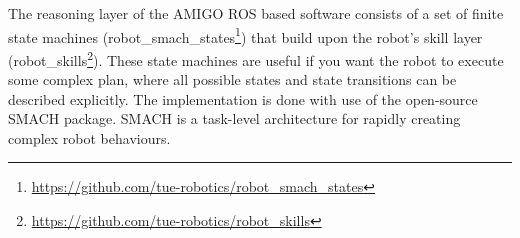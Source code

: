 The reasoning layer of the AMIGO ROS based software consists of a set of finite state machines (robot\_smach\_states\footnote{\url{https://github.com/tue-robotics/robot_smach_states}}) that build upon the robot’s skill layer (robot\_skills\footnote{\url{https://github.com/tue-robotics/robot_skills}}). These state machines are useful if you want the robot to execute some complex plan, where all possible states and state transitions can be described explicitly. The implementation is done with use of the open-source SMACH package. SMACH is a task-level architecture for rapidly creating complex robot behaviours. 